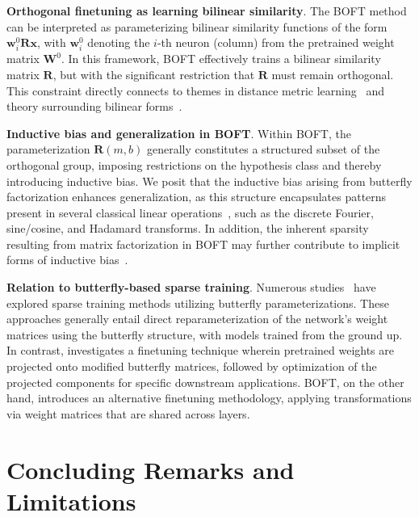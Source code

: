 \textbf{Orthogonal finetuning as learning bilinear similarity}. The BOFT method can be interpreted as parameterizing bilinear similarity functions of the form $\bm{w}^0_i\bm{R}\bm{x}$, with $\bm{w}^0_i$ denoting the $i$-th neuron (column) from the pretrained weight matrix $\bm{W}^0$. In this framework, BOFT effectively trains a bilinear similarity matrix $\bm{R}$, but with the significant restriction that $\bm{R}$ must remain orthogonal. This constraint directly connects to themes in distance metric learning~\cite{xing2002distance} and theory surrounding bilinear forms~\cite{roman2005advanced}.

\textbf{Inductive bias and generalization in BOFT}. Within BOFT, the parameterization $\bm{R}(m,b)$ generally constitutes a structured subset of the orthogonal group, imposing restrictions on the hypothesis class and thereby introducing inductive bias. We posit that the inductive bias arising from butterfly factorization enhances generalization, as this structure encapsulates patterns present in several classical linear operations~\cite{dao2019kaleidoscope}, such as the discrete Fourier, sine/cosine, and Hadamard transforms. In addition, the inherent sparsity resulting from matrix factorization in BOFT may further contribute to implicit forms of inductive bias~\cite{gunasekar2017implicit,li2018algorithmic,liu2019neural}.

\textbf{Relation to butterfly-based sparse training}. Numerous studies~\cite{dao2019learning,dao2019kaleidoscope,chen2022pixelated,dao2022monarch} have explored sparse training methods utilizing butterfly parameterizations. These approaches generally entail direct reparameterization of the network's weight matrices using the butterfly structure, with models trained from the ground up. In contrast, \cite{dao2022monarch} investigates a finetuning technique wherein pretrained weights are projected onto modified butterfly matrices, followed by optimization of the projected components for specific downstream applications. BOFT, on the other hand, introduces an alternative finetuning methodology, applying transformations via weight matrices that are shared across layers.



\section{Concluding Remarks and Limitations}

